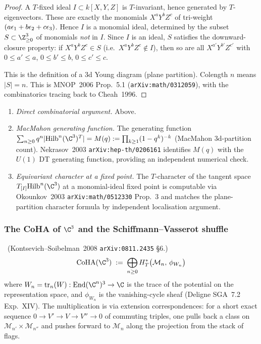 \begin{proof}
A $T$-fixed ideal $I \subset k[X, Y, Z]$ is $T$-invariant, hence generated by
$T$-eigenvectors. These are exactly the monomials $X^a Y^b Z^c$ of tri-weight
$(a\epsilon_1 + b\epsilon_2 + c\epsilon_3)$. Hence $I$ is a monomial ideal, determined by the
subset $S \subset \Z_{\geq 0}^3$ of monomials \emph{not} in $I$. Since $I$ is an
ideal, $S$ satisfies the downward-closure property: if $X^a Y^b Z^c \in S$
(i.e.\ $X^a Y^b Z^c \notin I$), then so are all $X^{a'} Y^{b'} Z^{c'}$ with
$0 \leq a' \leq a$, $0 \leq b' \leq b$, $0 \leq c' \leq c$.

This is the definition of a 3d Young diagram (plane partition). Colength $n$
means $|S| = n$. This is MNOP~2006 Prop.~5.1
(\texttt{arXiv:math/0312059}), with the combinatorics tracing back to
Cheah~1996.
\end{proof}

\begin{verification}
\label{w17:verif:plane-partitions}\mbox{}
\begin{enumerate}
\item \emph{Direct combinatorial argument.} Above.
\item \emph{MacMahon generating function.} The generating function
$\sum_{n \geq 0} q^n |\Hilb^n(\C^3)^T| = M(q) := \prod_{k \geq 1}(1 - q^k)^{-k}$
(MacMahon 3d-partition count). Nekrasov~2003 \texttt{arXiv:hep-th/0206161}
identifies $M(q)$ with the $U(1)$ DT generating function, providing an
independent numerical check.
\item \emph{Equivariant character at a fixed point.} The $T$-character of the
tangent space $T_{[I]}\Hilb^n(\C^3)$ at a monomial-ideal fixed point is
computable via Okounkov~2003 \texttt{arXiv:math/0512330} Prop.~3 and matches
the plane-partition character formula by independent localisation argument.
\end{enumerate}
\end{verification}

\subsubsection{The CoHA of $\C^3$ and the Schiffmann--Vasserot shuffle}
\label{w17:subsubsec:coha-shuffle}

\begin{definition}
\label{w17:def:coha}
\ClaimStatusDefinition\ (Kontsevich--Soibelman~2008 \texttt{arXiv:0811.2435} \S6.)
\[
 \CoHA(\C^3) \;:=\; \bigoplus_{n \geq 0} H^*_T\bigl(\mathcal{M}_n,\, \phi_{W_n}\bigr)
\]
where $W_n = \mathrm{tr}_n(W): \mathrm{End}(\C^n)^3 \to \C$ is the trace of the
potential on the representation space, and $\phi_{W_n}$ is the vanishing-cycle
sheaf (Deligne SGA~7.2 Exp.~XIV). The multiplication is via extension correspondences:
for a short exact sequence $0 \to V' \to V \to V'' \to 0$ of commuting triples, one
pulls back a class on $\mathcal{M}_{n'} \times \mathcal{M}_{n''}$ and pushes forward to
$\mathcal{M}_{n}$ along the projection from the stack of flags.
\end{definition}

